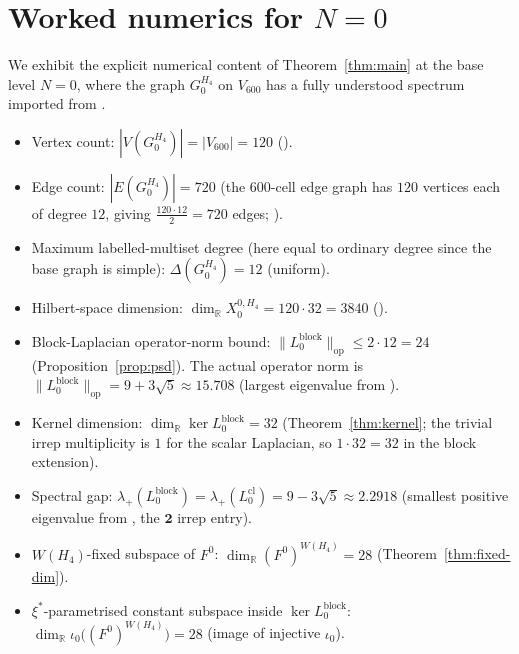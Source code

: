 \documentclass[11pt]{article}
\newcommand{\R}{\mathbb{R}}
\newcommand{\op}{\mathrm{op}}
\theoremstyle{definition}
\begin{document}
\section{Worked numerics for $N = 0$}
\label{sec:numerics}

We exhibit the explicit numerical content of
Theorem~\ref{thm:main} at the base level $N = 0$, where the
graph $G_0^{H_4}$ on $V_{600}$ has a fully understood spectrum
imported from \cite[Table~\texttt{tab:P2-spectrum}]{AlgebraicSubstrate}.

\begin{itemize}[leftmargin=2em]
\item Vertex count: $|V(G_0^{H_4})| = |V_{600}| = 120$
  (\cite[Definition~\texttt{def:V600}]{AlgebraicSubstrate}).
\item Edge count: $|E(G_0^{H_4})| = 720$
  (the $600$-cell edge graph has $120$ vertices each of degree
  $12$, giving $\tfrac{120 \cdot 12}{2} = 720$ edges;
  \cite[\S 22.7]{CoxeterRegularPolytopes}).
\item Maximum labelled-multiset degree (here equal to ordinary
  degree since the base graph is simple):
  $\Delta(G_0^{H_4}) = 12$ (uniform).
\item Hilbert-space dimension:
  $\dim_{\R} X_0^{0, H_4} = 120 \cdot 32 = 3840$
  (\cite[Proposition~\texttt{prop:Xn-Hilbert}]{RefinementSpaces}).
\item Block-Laplacian operator-norm bound:
  $\|L_0^{\mathrm{block}}\|_{\op} \leq 2 \cdot 12 = 24$
  (Proposition~\ref{prop:psd}). The actual operator norm is
  $\|L_0^{\mathrm{block}}\|_{\op} = 9 + 3\sqrt{5} \approx 15.708$
  (largest eigenvalue from
  \cite[Table~\texttt{tab:P2-spectrum}]{AlgebraicSubstrate}).
\item Kernel dimension:
  $\dim_{\R} \ker L_0^{\mathrm{block}} = 32$
  (Theorem~\ref{thm:kernel}; the trivial irrep multiplicity is
  $1$ for the scalar Laplacian, so $1 \cdot 32 = 32$ in the
  block extension).
\item Spectral gap:
  $\lambda_{+}(L_0^{\mathrm{block}}) = \lambda_{+}(L^{\mathrm{cl}}_0)
  = 9 - 3\sqrt{5} \approx 2.2918$
  (smallest positive eigenvalue from
  \cite[Table~\texttt{tab:P2-spectrum}]{AlgebraicSubstrate}, the
  $\mathbf{2}$ irrep entry).
\item $W(H_4)$-fixed subspace of $F^0$:
  $\dim_{\R} (F^0)^{W(H_4)} = 28$ (Theorem~\ref{thm:fixed-dim}).
\item $\xi^{*}$-parametrised constant subspace inside
  $\ker L_0^{\mathrm{block}}$:
  $\dim_{\R} \iota_0\bigl((F^0)^{W(H_4)}\bigr) = 28$
  (image of injective $\iota_0$).
\end{itemize}
\end{document}
